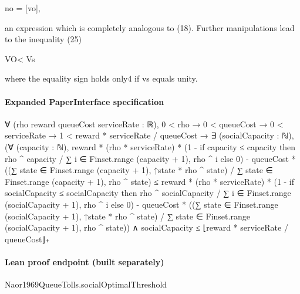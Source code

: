 \documentclass[10pt]{article}
\begin{document}
\begin{ReviewVerbatim}
no = [vo],

an expression which is completely analogous to (18). Further manipulations lead
to the inequality
(25)

VO< Vs

where the equality sign holds only4 if vs equals unity.
\end{ReviewVerbatim}



\paragraph{Expanded PaperInterface specification}
\begin{ReviewVerbatim}
∀ (rho reward queueCost serviceRate : ℝ),
  0 < rho →
    0 < queueCost →
      0 < serviceRate →
        1 < reward * serviceRate / queueCost →
          ∃ (socialCapacity : ℕ),
            (∀ (capacity : ℕ),
                reward * (rho * serviceRate) *
                      (1 -
                        if capacity ≤ capacity then rho ^ capacity / ∑ i ∈ Finset.range (capacity + 1), rho ^ i
                        else 0) -
                    queueCost *
                      ((∑ state ∈ Finset.range (capacity + 1), ↑state * rho ^ state) /
                        ∑ state ∈ Finset.range (capacity + 1), rho ^ state) ≤
                  reward * (rho * serviceRate) *
                      (1 -
                        if socialCapacity ≤ socialCapacity then
                          rho ^ socialCapacity / ∑ i ∈ Finset.range (socialCapacity + 1), rho ^ i
                        else 0) -
                    queueCost *
                      ((∑ state ∈ Finset.range (socialCapacity + 1), ↑state * rho ^ state) /
                        ∑ state ∈ Finset.range (socialCapacity + 1), rho ^ state)) ∧
              socialCapacity ≤ ⌊reward * serviceRate / queueCost⌋₊
\end{ReviewVerbatim}



\paragraph{Lean proof endpoint (built separately)}\begin{ReviewVerbatim}
Naor1969QueueTolls.socialOptimalThreshold
\end{ReviewVerbatim}
\end{document}
